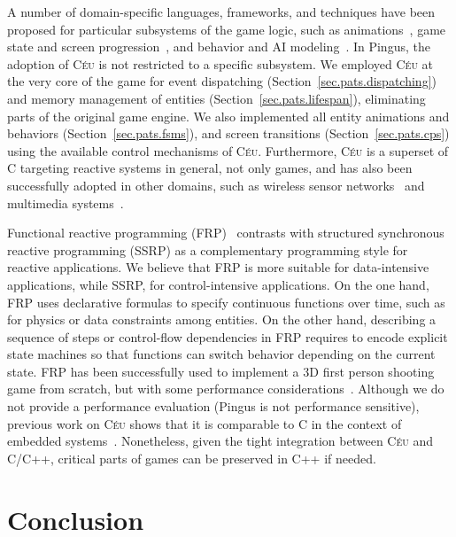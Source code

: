 \documentclass{vgtc}                          %
\newcommand{\CEU}{\textsc{C\'{e}u}\xspace}
\begin{document}
A number of domain-specific languages, frameworks, and techniques have been
proposed for particular subsystems of the game logic, such as
animations~\cite{games.anims.2006,games.anims.2003,games.anims.1996,games.anims.1982},
game state and screen progression~\cite{games.fsms.2006.1,games.fsms.2006.2}, and
behavior and AI modeling~\cite{games.bts,games.bts.unreal}.
%
In Pingus, the adoption of \CEU is not restricted to a specific subsystem.
We employed \CEU at the very core of the game for event dispatching
(Section~\ref{sec.pats.dispatching}) and memory management of entities
(Section~\ref{sec.pats.lifespan}), eliminating parts of the original game
engine.
We also implemented all entity animations and behaviors
(Section~\ref{sec.pats.fsms}), and screen transitions
(Section~\ref{sec.pats.cps})
using the available control mechanisms of \CEU.
%
Furthermore, \CEU is a superset of C targeting reactive systems in general, not
only games, and has also been successfully adopted in other domains, such as
    wireless sensor networks~\cite{ceu.sensys13,ceu.terra} and
    multimedia systems~\cite{ceu.media.webmedia16}.

Functional reactive programming (FRP)~\cite{frp.fran} contrasts with
structured synchronous reactive programming (SSRP) as a complementary
programming style for reactive applications.
%
We believe that FRP is more suitable for data-intensive applications, while 
SSRP, for control-intensive applications.
%
On the one hand, FRP uses declarative formulas to specify continuous functions 
over time, such as for physics or data constraints among entities.
%
On the other hand, describing a sequence of steps or control-flow dependencies
in FRP requires to encode explicit state machines so that functions can switch
behavior depending on the current state.
%
FRP has been successfully used to implement a 3D first person shooting game
from scratch, but with some performance considerations~\cite{games.frag}.
%
Although we do not provide a performance evaluation (Pingus is not performance
sensitive), previous work on \CEU shows that it is comparable to C in the
context of embedded systems~\cite{ceu.sensys13}.
Nonetheless, given the tight integration between \CEU and C/C++, critical parts
of games can be preserved in C++ if needed.

\section{Conclusion}
\label{sec.conclusion}
\end{document}
